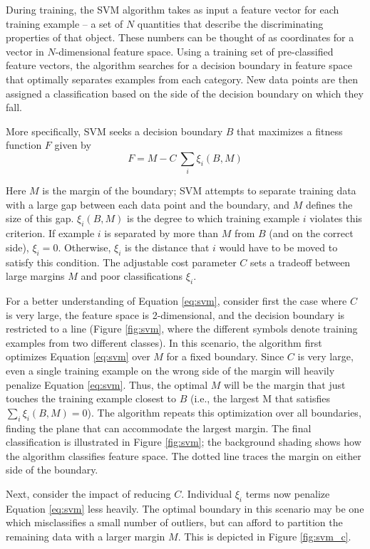 During training, the SVM algorithm takes as input a feature vector for each training example -- a set of $N$ quantities that describe the discriminating properties of that object. These numbers can be thought of as coordinates for a vector in $N$-dimensional feature space. Using a training set of pre-classified feature vectors, the algorithm searches for a decision boundary in feature space that optimally separates examples from each category. New data points are then assigned a classification based on the side of the decision boundary on which they fall.

More specifically, SVM seeks a decision boundary $B$ that maximizes a fitness function $F$ given by
\begin{equation}
F =M - C ~\sum_i{\xi_i(B, M)}
\label{eq:svm}
\end{equation}

Here $M$ is the margin of the boundary; SVM attempts to separate training data with a large gap between each data point and the boundary, and $M$ defines the size of this gap. $\xi_i(B, M)$ is the degree to which training example $i$ violates this criterion. If example $i$ is separated by more than $M$ from $B$ (and on the correct side), $\xi_i=0$. Otherwise, $\xi_i$ is the distance that $i$ would have to be moved to satisfy this condition. The adjustable cost parameter $C$ sets a tradeoff between large margins $M$ and poor classifications $\xi_i$.

For a better understanding of Equation \ref{eq:svm}, consider first the case where $C$ is very large, the feature space is 2-dimensional, and the decision boundary is  restricted to a line (Figure \ref{fig:svm}, where the different symbols denote training examples from two different classes). In this scenario, the algorithm first optimizes Equation \ref{eq:svm} over $M$ for a fixed boundary. Since $C$ is very large, even a single training example on the wrong side of the margin will heavily penalize Equation \ref{eq:svm}. Thus, the optimal $M$ will be the margin that just touches the training example closest to $B$ (i.e., the largest M that satisfies $\sum_i{\xi_i(B,M)} = 0$). The algorithm repeats this optimization over all boundaries, finding the plane that can accommodate the largest margin. The final classification is illustrated in Figure \ref{fig:svm}; the background shading shows how the algorithm classifies feature space. The dotted line traces the margin on either side of the boundary.

Next, consider the impact of reducing $C$. Individual $\xi_i$ terms now penalize Equation \ref{eq:svm} less heavily. The optimal boundary in this scenario may be one which misclassifies a small number of outliers, but can afford to partition the remaining data with a larger margin $M$. This is depicted in Figure \ref{fig:svm_c}.

